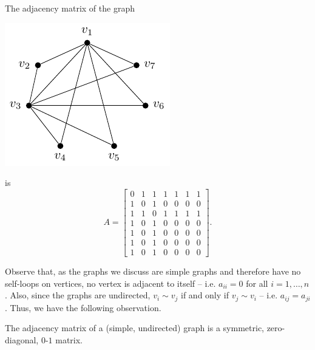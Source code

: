 \begin{Example}\label{ex:GNM(6-11)AdjMat}
The adjacency matrix of the graph
\begin{center}
\includegraphics{Images/GNM(6,11).pdf}
\end{center}
is
\begin{equation*}
A = \begin{bmatrix}
0 & 1 & 1 & 1 & 1 & 1 & 1 \\
1 & 0 & 1 & 0 & 0 & 0 & 0 \\
1 & 1 & 0 & 1 & 1 & 1 & 1 \\
1 & 0 & 1 & 0 & 0 & 0 & 0 \\
1 & 0 & 1 & 0 & 0 & 0 & 0 \\
1 & 0 & 1 & 0 & 0 & 0 & 0 \\
1 & 0 & 1 & 0 & 0 & 0 & 0
\end{bmatrix}.
\end{equation*}
\end{Example}

Observe that, as the graphs we discuss are simple graphs and therefore have no self-loops on vertices, no vertex is adjacent to itself -- i.e. $a_{ii} = 0$ for all $i = 1, \ldots, n$. Also, since the graphs are undirected, $v_i \sim v_j$ if and only if $v_j \sim v_i$ -- i.e. $a_{ij} = a_{ji}$. Thus, we have the following observation.

\begin{Observation}
The adjacency matrix of a (simple, undirected) graph is a symmetric, zero-diagonal, $0$-$1$ matrix.
\end{Observation}

